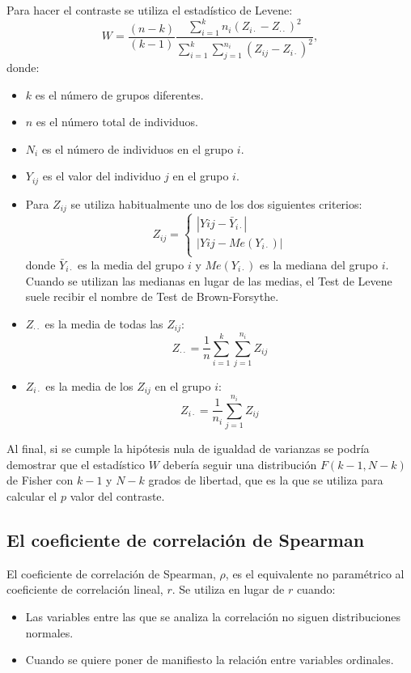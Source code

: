 \begin{description}
Para hacer el contraste se utiliza el estadístico de Levene:
\[
W = \frac{(n-k)}{(k-1)}\frac{\sum_{i=1}^k n_i(Z_{i\cdot}-Z_{\cdot\cdot})^2}{\sum_{i = 1}^k\sum_{j = 1}^{n_i}(Z_{ij}-Z_{i\cdot})^2}
,
\]
donde:
\begin{itemize}
\item $k$ es el número de grupos diferentes.
\item $n$ es el número total de individuos.
\item $N_i$ es el número de individuos en el grupo $i$.
\item $Y_{ij}$ es el valor del individuo $j$ en el grupo $i$.
\item Para $Z_{ij}$ se utiliza habitualmente uno de los dos siguientes criterios:
\[
Z_{ij} = 
\begin{cases}
|Yij-\bar Y_{i\cdot}| \\
|Yij - Me(Y_{i\cdot})|  \\
\end{cases}
\]
donde $\bar Y_{i\cdot}$ es la media del grupo $i$ y $Me(Y_{i\cdot})$ es la mediana del grupo $i$. Cuando se utilizan las medianas en lugar de las medias, el Test de Levene suele recibir el nombre de Test de Brown-Forsythe.

\item $Z_{\cdot\cdot}$ es la media de todas las $Z_{ij}$:
\[
Z_{\cdot\cdot} = \frac{1}{n}\sum_{i=1}^k\sum_{j=1}^{n_i}Z_{ij}
\]

\item $Z_{i\cdot}$ es la media de los $Z_{ij}$ en el grupo $i$:
\[
Z_{i\cdot} = \frac{1}{n_i }\sum_{j=1}^{n_i}Z_{ij}
\]
\end{itemize}

Al final, si se cumple la hipótesis nula de igualdad de varianzas se podría demostrar que el estadístico $W$ debería seguir una distribución $F(k-1,N-k)$ de Fisher con $k-1$ y $N-k$ grados de libertad, que es la que se utiliza para calcular el $p$ valor del contraste.


\subsection{El coeficiente de correlación de Spearman}
El coeficiente de correlación de Spearman, $\rho$, es el equivalente no paramétrico al coeficiente de correlación lineal, $r$. Se utiliza en lugar de $r$ cuando:

\begin{itemize}
\item Las variables entre las que se analiza la correlación no siguen distribuciones normales.
\item Cuando se quiere poner de manifiesto la relación entre variables ordinales.
\end{itemize}


\end{description}
